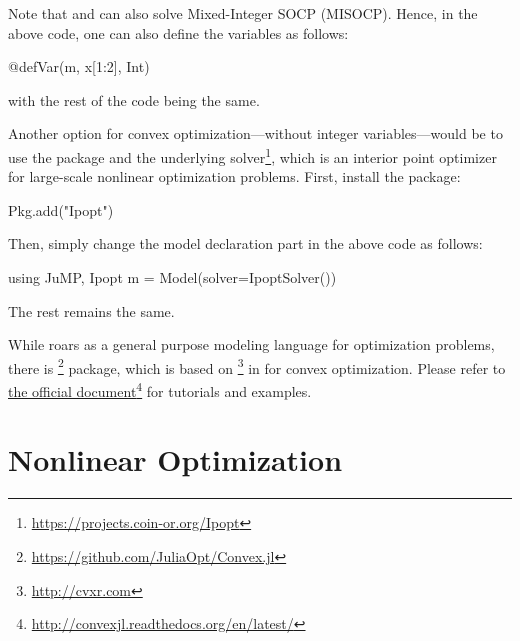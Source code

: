 Note that \gurobi{} and \cplex{} can also solve Mixed-Integer SOCP (MISOCP). Hence, in the above code, one can also define the variables as follows:
\begin{code}
@defVar(m, x[1:2], Int)
\end{code}
\noindent with the rest of the code being the same.

Another option for convex optimization---without integer variables---would be to use the  package and the underlying  solver\footnote{\url{https://projects.coin-or.org/Ipopt}}, which is an interior point optimizer for large-scale nonlinear optimization problems. First, install the package:
\begin{code}
Pkg.add("Ipopt")
\end{code}
\noindent Then, simply change the model declaration part in the above code as follows:
\begin{code}
using JuMP, Ipopt
m = Model(solver=IpoptSolver())
\end{code}
\noindent The rest remains the same.

While \jump{} roars as a general purpose modeling language for optimization problems, there is \href{https://github.com/JuliaOpt/Convex.jl}{}\footnote{\url{https://github.com/JuliaOpt/Convex.jl}} package, which is based on \href{http://cvxr.com}{}\footnote{\url{http://cvxr.com}} in  for convex optimization. Please refer to \href{http://convexjl.readthedocs.org/en/latest/}{the official document}\footnote{\url{http://convexjl.readthedocs.org/en/latest/}} for tutorials and examples.





\section{Nonlinear Optimization}

